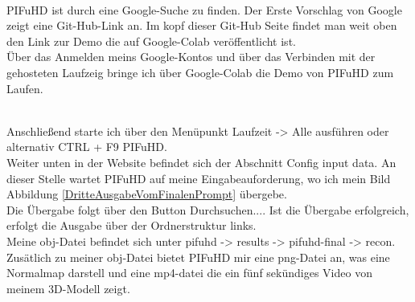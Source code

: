 \\
PIFuHD ist durch eine Google-Suche zu finden. Der Erste Vorschlag von Google zeigt eine Git-Hub-Link an. Im kopf dieser Git-Hub Seite findet man weit oben den Link zur Demo die auf Google-Colab veröffentlicht ist.
\\
Über das Anmelden meins Google-Kontos und über das Verbinden mit der gehosteten Laufzeig bringe ich über Google-Colab die Demo von PIFuHD zum Laufen.

\\
Anschließend starte ich über den Menüpunkt Laufzeit -> Alle ausführen oder alternativ CTRL + F9 PIFuHD.
\\
Weiter unten in der Website befindet sich der Abschnitt Config input data. An dieser Stelle wartet PIFuHD auf meine Eingabeauforderung, wo ich mein Bild Abbildung \ref{DritteAusgabeVomFinalenPrompt} übergebe.
\\
Die Übergabe folgt über den Button Durchsuchen.... Ist die Übergabe erfolgreich, erfolgt die Ausgabe über der Ordnerstruktur links.
\\
Meine obj-Datei befindet sich unter pifuhd -> results -> pifuhd-final -> recon. Zusätlich zu meiner obj-Datei bietet PIFuHD mir eine png-Datei an, was eine Normalmap darstell und eine mp4-datei die ein fünf sekündiges Video von meinem 3D-Modell zeigt.
\\

\\

